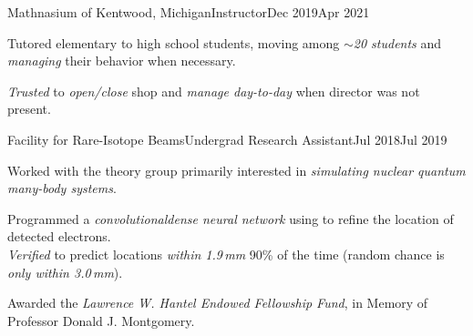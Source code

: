 \begin{job}{Mathnasium of Kentwood, Michigan}{Instructor}{Dec 2019}{Apr 2021}
    \item Tutored elementary to high school students,
        moving among \emph{${\sim}$20 students}
        and \emph{managing} their behavior when necessary.
    \item \emph{Trusted} to \emph{open/close} shop
        and \emph{manage day-to-day} when director was not present.
\end{job}

\begin{job}{Facility for Rare-Isotope Beams}{Undergrad Research Assistant}{Jul 2018}{Jul 2019}
    \item Worked with the theory group primarily interested
        in \emph{simulating nuclear quantum many-body systems}.
    \item Programmed a \emph{convolutional\unemph{+}dense neural network}
        using  to refine the location of detected electrons.
    \\
    \emph{Verified} to predict locations
        \emph{within 1.9\,mm} 90\% of the time
        (random chance is \emph{only within 3.0\,mm}).
    \item Awarded the \emph{Lawrence W. Hantel Endowed Fellowship Fund},
        in Memory of Professor Donald J. Montgomery.
\end{job}
